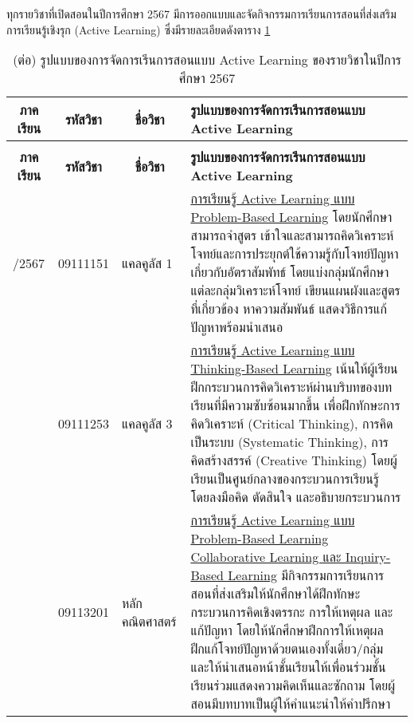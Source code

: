 \newpage
ทุกรายวิชาที่เปิดสอนในปีการศึกษา 2567 มีการออกแบบและจัดกิจกรรมการเรียนการสอนที่ส่งเสริมการเรียนรู้เชิงรุก (Active Learning) ซึ่งมีรายละเอียดดังตาราง \ref{table3.3}
{\small
	\begin{center}
		\begin{longtable}{|p{}|p{}|p{}|>{\raggedcolumns}p{}|}
			\caption{รูปแบบของการจัดการเรีนการสอนแบบ Active Learning ของรายวิชาในปีการศึกษา 2567}
			\label{table3.3}
			\\
			\hline
			\multicolumn{1}{|c|}{\textbf{ภาคเรียน}} &
			\multicolumn{1}{c|}{\textbf{รหัสวิชา}} &
			\multicolumn{1}{c|}{\textbf{ชื่อวิชา}} &
			\textbf{รูปแบบของการจัดการเรีนการสอนแบบ Active Learning}\\
			\hline
			\endfirsthead	
				\caption{(ต่อ) รูปแบบของการจัดการเรีนการสอนแบบ Active Learning ของรายวิชาในปีการศึกษา 2567 }\\
				\hline
			\multicolumn{1}{|c|}{\textbf{ภาคเรียน}} &
			\multicolumn{1}{c|}{\textbf{รหัสวิชา}} &
			\multicolumn{1}{c|}{\textbf{ชื่อวิชา}} &
			\textbf{รูปแบบของการจัดการเรีนการสอนแบบ Active Learning}\\
			\hline
			\endhead	
				\hline
				\endfoot
		1/2567&
	09111151&
	แคลคูลัส 1&
	\underline{การเรียนรู้ Active Learning แบบ Problem-Based Learning} โดยนักศึกษาสามารถจำสูตร เข้าใจและสามารถคิดวิเคราะห์โจทย์และการประยุกต์ใช้ความรู้กับโจทย์ปัญหาเกี่ยวกับอัตราสัมพัทธ์ โดยแบ่งกลุ่มนักศึกษาแต่ละกลุ่มวิเคราะห์โจทย์ เขียนแผนผังและสูตรที่เกี่ยวข้อง หาความสัมพันธ์ แสดงวิธีการแก้ปัญหาพร้อมนำเสนอ  	 
	\\ \cline{2-4}
	
	&09111253 &
	แคลคูลัส 3 &
	\underline{การเรียนรู้  Active Learning แบบ Thinking-Based Learning} เน้นให้ผู้เรียนฝึกกระบวนการคิดวิเคราะห์ผ่านบริบทของบทเรียนที่มีความซับซ้อนมากขึ้น เพื่อฝึกทักษะการคิดวิเคราะห์ (Critical Thinking), การคิดเป็นระบบ (Systematic Thinking), การคิดสร้างสรรค์ (Creative Thinking) โดยผู้เรียนเป็นศูนย์กลางของกระบวนการเรียนรู้ โดยลงมือคิด ตัดสินใจ และอธิบายกระบวนการ \\ \cline{2-4}
	
	&09113201&
	หลักคณิตศาสตร์&
	 \underline{การเรียนรู้ Active Learning แบบ Problem-Based Learning } \underline{Collaborative Learning และ Inquiry-Based Learning} มีกิจกรรมการเรียนการสอนที่ส่งเสริมให้นักศึกษาได้ฝึกทักษะกระบวนการคิดเชิงตรรกะ การให้เหตุผล และแก้ปัญหา โดยให้นักศึกษาฝึกการให้เหตุผล ฝึกแก้โจทย์ปัญหาด้วยตนเองทั้งเดี่ยว/กลุ่ม และให้นำเสนอหน้าชั้นเรียนให้เพื่อนร่วมชั้นเรียนร่วมแสดงความคิดเห็นและซักถาม โดยผู้สอนมีบทบาทเป็นผู้ให้คำแนะนำให้คำปรึกษา \\ \cline{2-4}
		

\end{longtable}
\end{center}}
